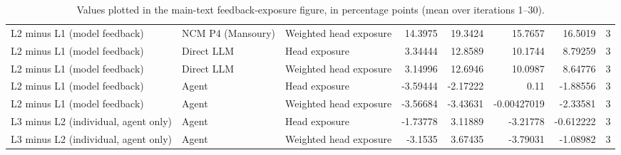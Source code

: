 \begin{table}[htbp!]
\begin{tabular}{lllrrrrr}
L2 minus L1 (model feedback) & NCM P4 (Mansoury) & Weighted head exposure & 14.3975 & 19.3424 & 15.7657 & 16.5019 & 3 \\
L2 minus L1 (model feedback) & Direct LLM & Head exposure & 3.34444 & 12.8589 & 10.1744 & 8.79259 & 3 \\
L2 minus L1 (model feedback) & Direct LLM & Weighted head exposure & 3.14996 & 12.6946 & 10.0987 & 8.64776 & 3 \\
L2 minus L1 (model feedback) & Agent & Head exposure & -3.59444 & -2.17222 & 0.11 & -1.88556 & 3 \\
L2 minus L1 (model feedback) & Agent & Weighted head exposure & -3.56684 & -3.43631 & -0.00427019 & -2.33581 & 3 \\
L3 minus L2 (individual, agent only) & Agent & Head exposure & -1.73778 & 3.11889 & -3.21778 & -0.612222 & 3 \\
L3 minus L2 (individual, agent only) & Agent & Weighted head exposure & -3.1535 & 3.67435 & -3.79031 & -1.08982 & 3 \\
\hline
\end{tabular}
\caption{Values plotted in the main-text feedback-exposure figure, in percentage points (mean over iterations 1--30).}
\label{chap:results:tab:main_rq1_feedback_exposure_values}
\end{table}
